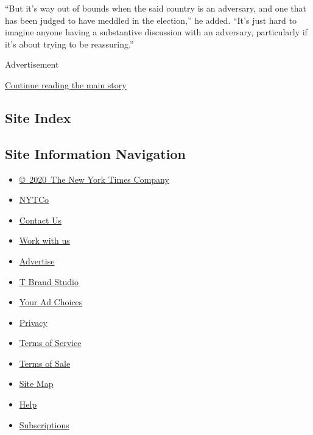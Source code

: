 ``But it's way out of bounds when the said country is an adversary, and
one that has been judged to have meddled in the election,'' he added.
``It's just hard to imagine anyone having a substantive discussion with
an adversary, particularly if it's about trying to be reassuring.''

Advertisement

\protect\hyperlink{after-bottom}{Continue reading the main story}

\hypertarget{site-index}{%
\subsection{Site Index}\label{site-index}}

\hypertarget{site-information-navigation}{%
\subsection{Site Information
Navigation}\label{site-information-navigation}}

\begin{itemize}
\tightlist
\item
  \href{https://help.nytimes.com/hc/en-us/articles/115014792127-Copyright-notice}{©~2020~The
  New York Times Company}
\end{itemize}

\begin{itemize}
\tightlist
\item
  \href{https://www.nytco.com/}{NYTCo}
\item
  \href{https://help.nytimes.com/hc/en-us/articles/115015385887-Contact-Us}{Contact
  Us}
\item
  \href{https://www.nytco.com/careers/}{Work with us}
\item
  \href{https://nytmediakit.com/}{Advertise}
\item
  \href{http://www.tbrandstudio.com/}{T Brand Studio}
\item
  \href{https://www.nytimes.com/privacy/cookie-policy\#how-do-i-manage-trackers}{Your
  Ad Choices}
\item
  \href{https://www.nytimes.com/privacy}{Privacy}
\item
  \href{https://help.nytimes.com/hc/en-us/articles/115014893428-Terms-of-service}{Terms
  of Service}
\item
  \href{https://help.nytimes.com/hc/en-us/articles/115014893968-Terms-of-sale}{Terms
  of Sale}
\item
  \href{https://spiderbites.nytimes.com}{Site Map}
\item
  \href{https://help.nytimes.com/hc/en-us}{Help}
\item
  \href{https://www.nytimes.com/subscription?campaignId=37WXW}{Subscriptions}
\end{itemize}
